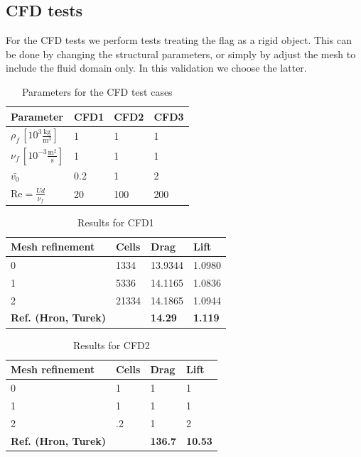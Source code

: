 \subsection{CFD tests}
For the CFD tests we perform tests treating the flag as a rigid object. This can be done by changing the structural parameters, or simply by adjust the mesh to include the fluid domain only. In this validation we choose the latter. 

\begin{table}[!ht]
\begin{center}
  \begin{tabular}{|l | l | l | l|} \hline
	Parameter & CFD1 & CFD2 & CFD3 \\ \hline
    $\rho_f\, [10^3\frac{\text{kg}}{\text{m}^3}]$  & 1 & 1 & 1 \\   \hline
    $\nu_f\, [10^{-3}\frac{\text{m}^2}{\text{s}}]$ & 1 & 1 & 1 \\ \hline
    $\bar{v_0}$ & 0.2 & 1 & 2   \\ \hline \hline
    $\text{Re} = \frac{Ud}{\nu_f}$ & 20 & 100 & 200 \\ \hline 
    \hline
  \end{tabular}
  \caption{Parameters for the CFD test cases}
\end{center}
\end{table}
\begin{table}[!ht]
\begin{center}
  \begin{tabular}{|l | l | l | l|} \hline
	Mesh refinement & Cells & Drag & Lift \\ \hline
    0  & 1334 & 13.9344 & 1.0980  \\   \hline
    1 & 5336 & 14.1165 & 1.0836 \\ \hline
    2 & 21334 & 14.1865 & 1.0944  \\ \hline \hline
    \textbf{Ref. (Hron, Turek)}  & & \textbf{14.29} & \textbf{1.119} \\ \hline 
    \hline
  \end{tabular}
\end{center}
\caption{Results for CFD1}
\end{table}

\begin{table}[!ht]
\begin{center}
  \begin{tabular}{|l | l | l | l|} \hline
	Mesh refinement & Cells & Drag & Lift \\ \hline
    0  & 1 & 1 & 1 \\   \hline
    1 & 1 & 1 & 1 \\ \hline
    2 &.2 & 1 & 2   \\ \hline \hline
    \textbf{Ref. (Hron, Turek)}  & & \textbf{136.7} & \textbf{10.53} \\ \hline 
    \hline
  \end{tabular}
\end{center}
\caption{Results for CFD2}
\end{table}
